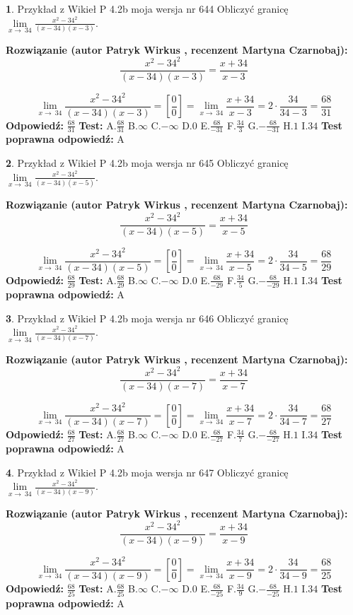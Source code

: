 \documentclass[12pt, a4paper]{article}
\theoremstyle{definition} %
\newtheorem{zad}{}
\newcommand{\zadStart}[1]{\begin{zad}#1\newline}
\newcommand{\zadStop}{\end{zad}}
\newcommand{\rozwStart}[2]{\noindent \textbf{Rozwiązanie (autor #1 , recenzent #2): }\newline}
\newcommand{\rozwStop}{\newline}
\newcommand{\odpStart}{\noindent \textbf{Odpowiedź:}\newline}
\newcommand{\odpStop}{\newline}
\newcommand{\testStart}{\noindent \textbf{Test:}\newline}
\newcommand{\testStop}{\newline}
\newcommand{\kluczStart}{\noindent \textbf{Test poprawna odpowiedź:}\newline}
\newcommand{\kluczStop}{\newline}
\begin{document}
\zadStart{Przykład z Wikieł P 4.2b moja wersja nr 644}
Obliczyć granicę $\lim\limits_{x\to\ 34}\frac{x^{2}-34^{2}}{(x-34)(x-3)}$.
\zadStop
\rozwStart{Patryk Wirkus}{Martyna Czarnobaj}
$$\frac{x^{2}-34^{2}}{(x-34)(x-3)}=\frac{x+34}{x-3}$$

$$\lim\limits_{x\to\ 34}\frac{x^{2}-34^{2}}{(x-34)(x-3)}=[\frac{0}{0}]=\lim\limits_{x\to\ 34}\frac{x+34}{x-3}=2 \cdot \frac{34}{34-3} = \frac{68}{31}$$
\rozwStop
\odpStart
$\frac{68}{31}$
\odpStop
\testStart
A.$\frac{68}{31}$
B.$\infty$
C.$-\infty$
D.$0$
E.$\frac{68}{-31}$
F.$\frac{34}{3}$
G.$-\frac{68}{-31}$
H.$1$
I.$34$
\testStop
\kluczStart
A
\kluczStop



\zadStart{Przykład z Wikieł P 4.2b moja wersja nr 645}
Obliczyć granicę $\lim\limits_{x\to\ 34}\frac{x^{2}-34^{2}}{(x-34)(x-5)}$.
\zadStop
\rozwStart{Patryk Wirkus}{Martyna Czarnobaj}
$$\frac{x^{2}-34^{2}}{(x-34)(x-5)}=\frac{x+34}{x-5}$$

$$\lim\limits_{x\to\ 34}\frac{x^{2}-34^{2}}{(x-34)(x-5)}=[\frac{0}{0}]=\lim\limits_{x\to\ 34}\frac{x+34}{x-5}=2 \cdot \frac{34}{34-5} = \frac{68}{29}$$
\rozwStop
\odpStart
$\frac{68}{29}$
\odpStop
\testStart
A.$\frac{68}{29}$
B.$\infty$
C.$-\infty$
D.$0$
E.$\frac{68}{-29}$
F.$\frac{34}{5}$
G.$-\frac{68}{-29}$
H.$1$
I.$34$
\testStop
\kluczStart
A
\kluczStop



\zadStart{Przykład z Wikieł P 4.2b moja wersja nr 646}
Obliczyć granicę $\lim\limits_{x\to\ 34}\frac{x^{2}-34^{2}}{(x-34)(x-7)}$.
\zadStop
\rozwStart{Patryk Wirkus}{Martyna Czarnobaj}
$$\frac{x^{2}-34^{2}}{(x-34)(x-7)}=\frac{x+34}{x-7}$$

$$\lim\limits_{x\to\ 34}\frac{x^{2}-34^{2}}{(x-34)(x-7)}=[\frac{0}{0}]=\lim\limits_{x\to\ 34}\frac{x+34}{x-7}=2 \cdot \frac{34}{34-7} = \frac{68}{27}$$
\rozwStop
\odpStart
$\frac{68}{27}$
\odpStop
\testStart
A.$\frac{68}{27}$
B.$\infty$
C.$-\infty$
D.$0$
E.$\frac{68}{-27}$
F.$\frac{34}{7}$
G.$-\frac{68}{-27}$
H.$1$
I.$34$
\testStop
\kluczStart
A
\kluczStop



\zadStart{Przykład z Wikieł P 4.2b moja wersja nr 647}
Obliczyć granicę $\lim\limits_{x\to\ 34}\frac{x^{2}-34^{2}}{(x-34)(x-9)}$.
\zadStop
\rozwStart{Patryk Wirkus}{Martyna Czarnobaj}
$$\frac{x^{2}-34^{2}}{(x-34)(x-9)}=\frac{x+34}{x-9}$$

$$\lim\limits_{x\to\ 34}\frac{x^{2}-34^{2}}{(x-34)(x-9)}=[\frac{0}{0}]=\lim\limits_{x\to\ 34}\frac{x+34}{x-9}=2 \cdot \frac{34}{34-9} = \frac{68}{25}$$
\rozwStop
\odpStart
$\frac{68}{25}$
\odpStop
\testStart
A.$\frac{68}{25}$
B.$\infty$
C.$-\infty$
D.$0$
E.$\frac{68}{-25}$
F.$\frac{34}{9}$
G.$-\frac{68}{-25}$
H.$1$
I.$34$
\testStop
\kluczStart
A
\kluczStop
\end{document}
